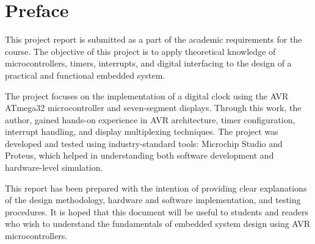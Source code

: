 \chapter*{Preface}

This project report is submitted as a part of the academic requirements for the \Course{} course. 
The objective of this project is to apply theoretical knowledge of microcontrollers, timers, 
interrupts, and digital interfacing to the design of a practical and functional embedded system.

The project focuses on the implementation of a digital clock using the AVR ATmega32 
microcontroller and seven-segment displays. Through this work, the author, \Authors{} gained 
hands-on experience in AVR architecture, timer configuration, interrupt handling, and display 
multiplexing techniques. The project was developed and tested using industry-standard tools: 
Microchip Studio and Proteus, which helped in understanding both software development and 
hardware-level simulation.

This report has been prepared with the intention of providing clear explanations of the design 
methodology, hardware and software implementation, and testing procedures. It is hoped that 
this document will be useful to students and readers who wish to understand the fundamentals of 
embedded system design using AVR microcontrollers.
